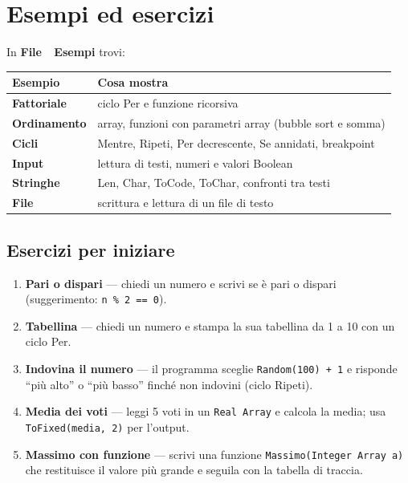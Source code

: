 \documentclass[11pt,a4paper]{article}
\newcommand{\code}[1]{\colorbox{ofSurface}{\texttt{\small #1}}}
\newcommand{\menuarrow}{\,\textsf{\guilsinglright}\,}
\begin{document}
\section{Esempi ed esercizi}
In \textbf{File \menuarrow{} Esempi} trovi:

\begin{tabularx}{\linewidth}{>{\bfseries}l X}
  \toprule
  Esempio & \textbf{Cosa mostra} \\
  \midrule
  Fattoriale & ciclo Per e funzione ricorsiva \\
  Ordinamento & array, funzioni con parametri array (bubble sort e somma) \\
  Cicli & Mentre, Ripeti, Per decrescente, Se annidati, breakpoint \\
  Input & lettura di testi, numeri e valori Boolean \\
  Stringhe & Len, Char, ToCode, ToChar, confronti tra testi \\
  File & scrittura e lettura di un file di testo \\
  \bottomrule
\end{tabularx}

\subsection{Esercizi per iniziare}
\begin{enumerate}[leftmargin=1.8em]
  \item \textbf{Pari o dispari} --- chiedi un numero e scrivi se è pari o dispari (suggerimento: \code{n \% 2 == 0}).
  \item \textbf{Tabellina} --- chiedi un numero e stampa la sua tabellina da 1 a 10 con un ciclo Per.
  \item \textbf{Indovina il numero} --- il programma sceglie \code{Random(100) + 1} e risponde ``più alto'' o ``più basso'' finché non indovini (ciclo Ripeti).
  \item \textbf{Media dei voti} --- leggi 5 voti in un \code{Real Array} e calcola la media; usa \code{ToFixed(media, 2)} per l'output.
  \item \textbf{Massimo con funzione} --- scrivi una funzione \code{Massimo(Integer Array a)} che restituisce il valore più grande e seguila con la tabella di traccia.
\end{enumerate}

\end{document}
